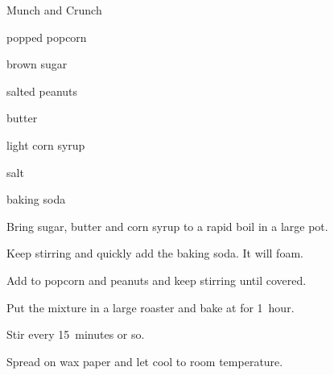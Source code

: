 \begin{recipe}{Munch and Crunch}{}{}

\begin{ingredients}
\item {} popped popcorn
\item {} brown sugar
\item \C{1 \half} salted peanuts
\item {} butter
\item \C{\half} light corn syrup
\item {} salt
\item \tp{\half} baking soda
\end{ingredients}

\begin{directions}
\item Bring sugar, butter and corn syrup to a rapid boil in a large pot.
\item Keep stirring and quickly add the baking soda. It will foam.
\item Add to popcorn and peanuts and keep stirring until covered.
\item Put the mixture in a large roaster and bake at  for 1~hour.
\item Stir every 15~minutes or so.
\item Spread on wax paper and let cool to room temperature.
\end{directions}
\end{recipe}
